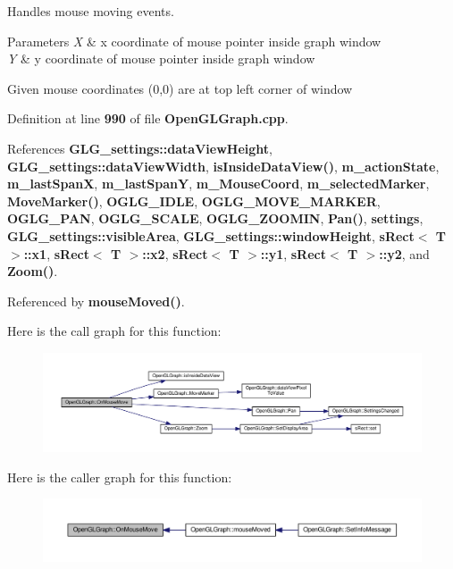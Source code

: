 Handles mouse moving events. 


\begin{DoxyParams}{Parameters}
{\em X} & x coordinate of mouse pointer inside graph window \\
\hline
{\em Y} & y coordinate of mouse pointer inside graph window\\
\hline
\end{DoxyParams}
Given mouse coordinates (0,0) are at top left corner of window 

Definition at line {\bf 990} of file {\bf Open\+G\+L\+Graph.\+cpp}.



References {\bf G\+L\+G\+\_\+settings\+::data\+View\+Height}, {\bf G\+L\+G\+\_\+settings\+::data\+View\+Width}, {\bf is\+Inside\+Data\+View()}, {\bf m\+\_\+action\+State}, {\bf m\+\_\+last\+SpanX}, {\bf m\+\_\+last\+SpanY}, {\bf m\+\_\+\+Mouse\+Coord}, {\bf m\+\_\+selected\+Marker}, {\bf Move\+Marker()}, {\bf O\+G\+L\+G\+\_\+\+I\+D\+LE}, {\bf O\+G\+L\+G\+\_\+\+M\+O\+V\+E\+\_\+\+M\+A\+R\+K\+ER}, {\bf O\+G\+L\+G\+\_\+\+P\+AN}, {\bf O\+G\+L\+G\+\_\+\+S\+C\+A\+LE}, {\bf O\+G\+L\+G\+\_\+\+Z\+O\+O\+M\+IN}, {\bf Pan()}, {\bf settings}, {\bf G\+L\+G\+\_\+settings\+::visible\+Area}, {\bf G\+L\+G\+\_\+settings\+::window\+Height}, {\bf s\+Rect$<$ T $>$\+::x1}, {\bf s\+Rect$<$ T $>$\+::x2}, {\bf s\+Rect$<$ T $>$\+::y1}, {\bf s\+Rect$<$ T $>$\+::y2}, and {\bf Zoom()}.



Referenced by {\bf mouse\+Moved()}.



Here is the call graph for this function\+:
\nopagebreak
\begin{figure}[H]
\begin{center}
\leavevmode
\includegraphics[width=350pt]{d9/d73/classOpenGLGraph_a5badebff271f771d399b2bc049d0251b_cgraph}
\end{center}
\end{figure}




Here is the caller graph for this function\+:
\nopagebreak
\begin{figure}[H]
\begin{center}
\leavevmode
\includegraphics[width=350pt]{d9/d73/classOpenGLGraph_a5badebff271f771d399b2bc049d0251b_icgraph}
\end{center}
\end{figure}


